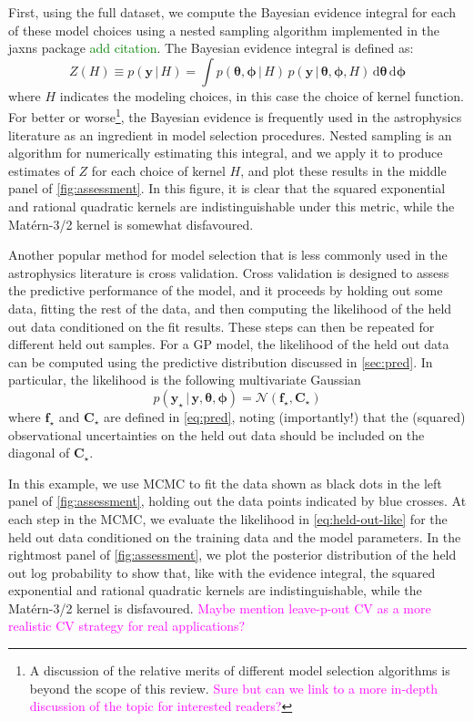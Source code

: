 \documentclass[letterpaper]{ar-1col}
\newcommand{\suz}[1]{\textcolor{magenta}{#1}}
\newcommand{\dan}[1]{\textcolor{green}{#1}}
\newcommand{\ydata}{\ensuremath{\boldsymbol{y}}}
\newcommand{\hyperparams}{\ensuremath{\boldsymbol{\phi}}}
\newcommand{\meanparams}{\ensuremath{\boldsymbol{\theta}}}
\begin{document}
First, using the full dataset, we compute the Bayesian evidence integral for each of these model choices using a nested sampling algorithm implemented in the \textsf{jaxns} package \dan{add citation}.
The Bayesian evidence integral is defined as:
\begin{equation}
  Z(H) \equiv p(\ydata\,|\,H) = \int p(\meanparams,\hyperparams\,|\,H)\,p(\ydata\,|\,\meanparams,\hyperparams,H)\,\mathrm{d}\meanparams\,\mathrm{d}\hyperparams
\end{equation}
where $H$ indicates the modeling choices, in this case the choice of kernel function.
For better or worse\footnote{A discussion of the relative merits of different model selection algorithms is beyond the scope of this review. \suz{Sure but can we link to a more in-depth discussion of the topic for interested readers?}}, the Bayesian evidence is frequently used in the astrophysics literature as an ingredient in model selection procedures.
Nested sampling is an algorithm for numerically estimating this integral, and we apply it to produce estimates of $Z$ for each choice of kernel $H$, and plot these results in the middle panel of \autoref{fig:assessment}.
In this figure, it is clear that the squared exponential and rational quadratic kernels are indistinguishable under this metric, while the Mat\'ern-3/2 kernel is somewhat disfavoured. 

Another popular method for model selection that is less commonly used in the astrophysics literature is cross validation.
Cross validation is designed to assess the predictive performance of the model, and it proceeds by holding out some data, fitting the rest of the data, and then computing the likelihood of the held out data conditioned on the fit results.
These steps can then be repeated for different held out samples.
For a GP model, the likelihood of the held out data can be computed using the predictive distribution discussed in \autoref{sec:pred}.
In particular, the likelihood is the following multivariate Gaussian
\begin{equation}\label{eq:held-out-like}
  p(\ydata_\star\,|\,\ydata,\meanparams, \hyperparams) = \mathcal{N}(\boldsymbol{f}_\star,\boldsymbol{C}_\star)
\end{equation}
where $\boldsymbol{f}_\star$ and $\boldsymbol{C}_\star$ are defined in \autoref{eq:pred}, noting (importantly!) that the (squared) observational uncertainties on the held out data should be included on the diagonal of $\boldsymbol{C}_\star$.

In this example, we use MCMC to fit the data shown as black dots in the left panel of \autoref{fig:assessment}, holding out the data points indicated by blue crosses.
At each step in the MCMC, we evaluate the likelihood in \autoref{eq:held-out-like} for the held out data conditioned on the training data and the model parameters.
In the rightmost panel of \autoref{fig:assessment}, we plot the posterior distribution of the held out log probability to show that, like with the evidence integral, the squared exponential and rational quadratic kernels are indistinguishable, while the Mat\'ern-3/2 kernel is disfavoured. 
\suz{Maybe mention leave-p-out CV as a more realistic CV strategy for real applications?}
\end{document}
